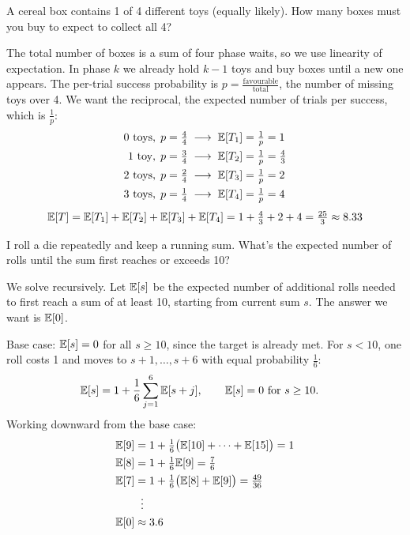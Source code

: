 \begin{problem}
A cereal box contains 1 of 4 different toys (equally likely). How many boxes must you buy to expect to collect all 4?
\end{problem}

\begin{solution}
The total number of boxes is a sum of four phase waits, so we use linearity of expectation. In phase $k$ we already hold $k-1$ toys and buy boxes until a new one appears. The per-trial success probability is $p = \frac{\text{favourable}}{\text{total}}$, the number of missing toys over 4. We want the reciprocal, the expected number of trials per success, which is $\frac{1}{p}$:
\begin{align*}
0 \text{ toys}, \; p = \tfrac{4}{4} \;&\longrightarrow\; \mathbb{E}[T_1] = \tfrac{1}{p} = 1 \\
1 \text{ toy}, \; p = \tfrac{3}{4} \;&\longrightarrow\; \mathbb{E}[T_2] = \tfrac{1}{p} = \tfrac{4}{3} \\
2 \text{ toys}, \; p = \tfrac{2}{4} \;&\longrightarrow\; \mathbb{E}[T_3] = \tfrac{1}{p} = 2 \\
3 \text{ toys}, \; p = \tfrac{1}{4} \;&\longrightarrow\; \mathbb{E}[T_4] = \tfrac{1}{p} = 4
\end{align*}
\[
\mathbb{E}[T] = \mathbb{E}[T_1] + \mathbb{E}[T_2] + \mathbb{E}[T_3] + \mathbb{E}[T_4] = 1 + \tfrac{4}{3} + 2 + 4 = \tfrac{25}{3} \approx 8.33
\]
\end{solution}

\begin{problem}
I roll a die repeatedly and keep a running sum. What's the expected number of rolls until the sum first reaches or exceeds 10?
\end{problem}

\begin{solution}
We solve recursively. Let $\mathbb{E}[s]$ be the expected number of additional rolls needed to first reach a sum of at least 10, starting from current sum $s$. The answer we want is $\mathbb{E}[0]$.

Base case: $\mathbb{E}[s] = 0$ for all $s \geq 10$, since the target is already met. For $s < 10$, one roll costs 1 and moves to $s+1, \dots, s+6$ with equal probability $\frac{1}{6}$:
\begin{align*}
\mathbb{E}[s] &= 1 + \frac{1}{6}\sum_{j=1}^{6} \mathbb{E}[s+j], \qquad \mathbb{E}[s] = 0 \text{ for } s \geq 10.
\end{align*}
Working downward from the base case:
\begin{align*}
\mathbb{E}[9] &= 1 + \tfrac{1}{6}\bigl(\mathbb{E}[10] + \cdots + \mathbb{E}[15]\bigr) = 1 \\
\mathbb{E}[8] &= 1 + \tfrac{1}{6}\mathbb{E}[9] = \tfrac{7}{6} \\
\mathbb{E}[7] &= 1 + \tfrac{1}{6}\bigl(\mathbb{E}[8] + \mathbb{E}[9]\bigr) = \tfrac{49}{36} \\
      &\;\;\vdots \\
\mathbb{E}[0] &\approx 3.6
\end{align*}
\end{solution}

